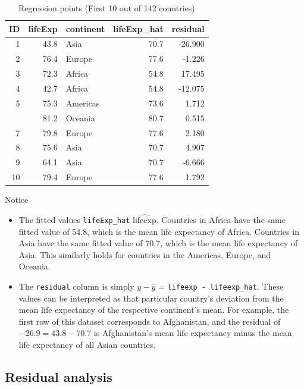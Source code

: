 \documentclass[12pt,]{krantz}
\providecommand{\tightlist}{%
  \setlength{\itemsep}{0pt}\setlength{\parskip}{0pt}}
\theoremstyle{definition}
\theoremstyle{definition}
\theoremstyle{definition}
\theoremstyle{remark}
\begin{document}
\begin{table}[H]

\caption{\label{tab:unnamed-chunk-203}Regression points (First 10 out of 142 countries)}
\centering
\fontsize{10}{12}\selectfont
\begin{tabular}[t]{rrlrr}
\toprule
ID & lifeExp & continent & lifeExp\_hat & residual\\
\midrule
1 & 43.8 & Asia & 70.7 & -26.900\\
2 & 76.4 & Europe & 77.6 & -1.226\\
3 & 72.3 & Africa & 54.8 & 17.495\\
4 & 42.7 & Africa & 54.8 & -12.075\\
5 & 75.3 & Americas & 73.6 & 1.712\\
\addlinespace
6 & 81.2 & Oceania & 80.7 & 0.515\\
7 & 79.8 & Europe & 77.6 & 2.180\\
8 & 75.6 & Asia & 70.7 & 4.907\\
9 & 64.1 & Asia & 70.7 & -6.666\\
10 & 79.4 & Europe & 77.6 & 1.792\\
\bottomrule
\end{tabular}
\end{table}

Notice

\begin{itemize}
\tightlist
\item
  The fitted values \texttt{lifeExp\_hat} \(\widehat{\text{lifeexp}}\).
  Countries in Africa have the same fitted value of 54.8, which is the
  mean life expectancy of Africa. Countries in Asia have the same fitted
  value of 70.7, which is the mean life expectancy of Asia. This
  similarly holds for countries in the Americas, Europe, and Oceania.
\item
  The \texttt{residual} column is simply \(y - \widehat{y}\) =
  \texttt{lifeexp\ -\ lifeexp\_hat}. These values can be interpreted as
  that particular country's deviation from the mean life expectancy of
  the respective continent's mean. For example, the first row of this
  dataset corresponds to Afghanistan, and the residual of
  \(-26.9 = 43.8 - 70.7\) is Afghanistan's mean life expectancy minus
  the mean life expectancy of all Asian countries.
\end{itemize}

\subsection{Residual analysis}\label{model2residuals}
\end{document}
